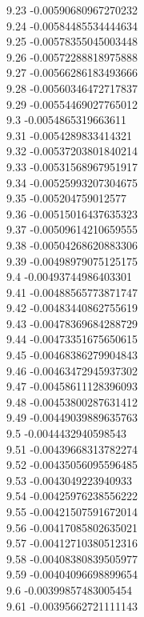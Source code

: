 {9.23	-0.00590680967270232\\
9.24	-0.00584485534444634\\
9.25	-0.00578355045003448\\
9.26	-0.00572288818975888\\
9.27	-0.00566286183493666\\
9.28	-0.00560346472717837\\
9.29	-0.00554469027765012\\
9.3	-0.0054865319663611\\
9.31	-0.0054289833414321\\
9.32	-0.00537203801840214\\
9.33	-0.00531568967951917\\
9.34	-0.00525993207304675\\
9.35	-0.005204759012577\\
9.36	-0.00515016437635323\\
9.37	-0.00509614210659555\\
9.38	-0.00504268620883306\\
9.39	-0.00498979075125175\\
9.4	-0.00493744986403301\\
9.41	-0.00488565773871747\\
9.42	-0.00483440862755619\\
9.43	-0.00478369684288729\\
9.44	-0.00473351675650615\\
9.45	-0.00468386279904843\\
9.46	-0.00463472945937302\\
9.47	-0.00458611128396093\\
9.48	-0.00453800287631412\\
9.49	-0.00449039889635763\\
9.5	-0.0044432940598543\\
9.51	-0.00439668313782274\\
9.52	-0.00435056095596485\\
9.53	-0.0043049223940933\\
9.54	-0.00425976238556222\\
9.55	-0.00421507591672014\\
9.56	-0.00417085802635021\\
9.57	-0.00412710380512316\\
9.58	-0.00408380839505977\\
9.59	-0.00404096698899654\\
9.6	-0.00399857483005454\\
9.61	-0.00395662721111143\\
}
